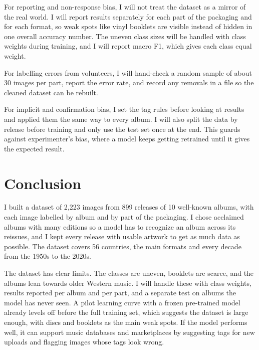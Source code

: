 \documentclass[11pt,a4paper]{article}
\begin{document}
For reporting and non-response bias, I will not treat the dataset as a mirror of the real world. I will report results separately for each part of the packaging and for each format, so weak spots like vinyl booklets are visible instead of hidden in one overall accuracy number. The uneven class sizes will be handled with class weights during training, and I will report macro F1, which gives each class equal weight.

For labelling errors from volunteers, I will hand-check a random sample of about 30 images per part, report the error rate, and record any removals in a file so the cleaned dataset can be rebuilt.

For implicit and confirmation bias, I set the tag rules before looking at results and applied them the same way to every album. I will also split the data by release before training and only use the test set once at the end. This guards against experimenter's bias, where a model keeps getting retrained until it gives the expected result.

\section{Conclusion}
I built a dataset of 2,223 images from 899 releases of 10 well-known albums, with each image labelled by album and by part of the packaging. I chose acclaimed albums with many editions so a model has to recognize an album across its reissues, and I kept every release with usable artwork to get as much data as possible. The dataset covers 56 countries, the main formats and every decade from the 1950s to the 2020s.

The dataset has clear limits. The classes are uneven, booklets are scarce, and the albums lean towards older Western music. I will handle these with class weights, results reported per album and per part, and a separate test on albums the model has never seen. A pilot learning curve with a frozen pre-trained model already levels off before the full training set, which suggests the dataset is large enough, with discs and booklets as the main weak spots. If the model performs well, it can support music databases and marketplaces by suggesting tags for new uploads and flagging images whose tags look wrong.

\clearpage


\end{document}
